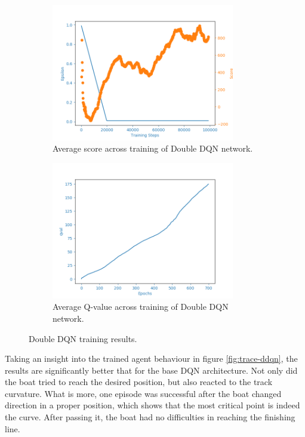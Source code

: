 \begin{figure}[h]
\begin{subfigure}{.48\textwidth}
    \centering
    \includegraphics[width=8cm]{img/DDQNAgent_WamvNavTwoSetsBuoys-v0_normal_1126_0854.png}
    \caption{Average score across training of Double DQN network.}
    \label{fig:avg-score-ddqn}
\end{subfigure}
\begin{subfigure}{.48\textwidth}
    \centering
    \includegraphics[width=8cm]{img/DDQNAgent_WamvNavTwoSetsBuoys-v0_normal_1126_0854_qval.png}
    \caption{Average Q-value across training of Double DQN network.}
    \label{fig:avg-qval-ddqn}
\end{subfigure}
\caption{Double DQN training results.}
\label{fig:ddqn-results}
\end{figure}

Taking an insight into the trained agent behaviour in figure \ref{fig:trace-ddqn}, the results are significantly better that for the base
DQN architecture. Not only did the boat tried to reach the desired position, but also reacted to the track curvature. What is more, one
episode was successful after the boat changed direction in a proper position, which shows that the most critical point is indeed the curve. After passing it, the boat had no difficulties in reaching the finishing line.

